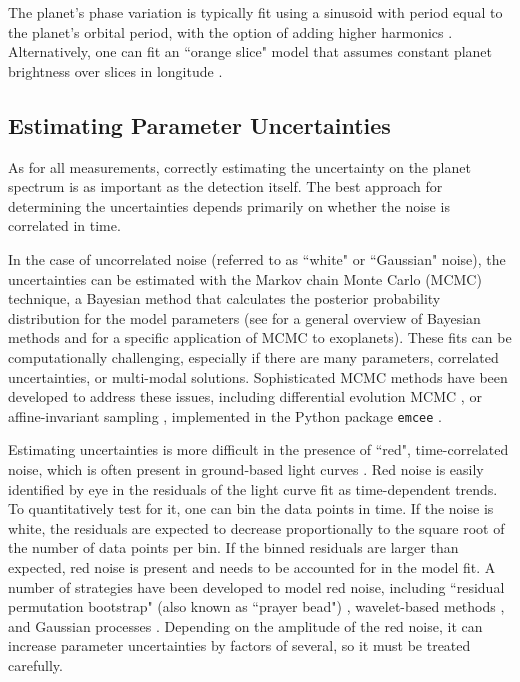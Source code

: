 \documentclass[graybox,natbib,nosecnum]{svmult}
\begin{document}
The planet's phase variation is typically fit using a sinusoid with period equal to the planet's orbital period, with the option of adding higher harmonics \citep[e.g.][]{knutson12, stevenson16}. Alternatively, one can fit an ``orange slice" model that assumes constant planet brightness over slices in longitude \citep{knutson07, cowan08}. 

\subsection{Estimating Parameter Uncertainties}
As for all measurements, correctly estimating the uncertainty on the planet spectrum is as important as the detection itself.  The best approach for determining the uncertainties depends primarily on whether the noise is correlated in time.  

In the case of uncorrelated noise (referred to as ``white" or ``Gaussian" noise), the uncertainties can be estimated with the Markov chain Monte Carlo (MCMC) technique, a Bayesian method that calculates the posterior probability distribution for the model parameters (see \citealt{sivia96} for a general overview of Bayesian methods and \citealt{ford05} for a specific application of MCMC to exoplanets). These fits can be computationally challenging, especially if there are many parameters, correlated uncertainties, or multi-modal solutions. Sophisticated MCMC methods have been developed to address these issues, including differential evolution MCMC \citep{braak06}, or affine-invariant sampling \citep{goodman10}, implemented in the Python package \texttt{emcee} \citep{foremanmackey13}.

Estimating uncertainties is more difficult in the presence of ``red", time-correlated noise, which is often present in ground-based light curves \citep{}. Red noise is easily identified by eye in the residuals of the light curve fit as time-dependent trends. To quantitatively test for it, one can bin the data points in time. If the noise is white, the residuals are expected to decrease proportionally to the square root of the number of data points per bin. If the binned residuals are larger than expected, red noise is present and needs to be accounted for in the model fit.  A number of strategies have been developed to model red noise, including ``residual permutation bootstrap" (also known as ``prayer bead")  \citep{southworth08}, wavelet-based methods \citep{carter09}, and Gaussian processes \citep{rasmussen05}. Depending on the amplitude of the red noise, it can increase parameter uncertainties by factors of several, so it must be treated carefully.
\end{document}
